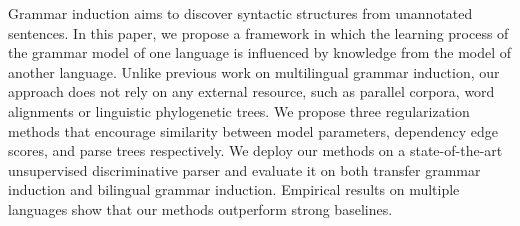 Grammar induction aims to discover syntactic structures from unannotated sentences.
In this paper, we propose a framework in which the learning process of the grammar model of one language is influenced by knowledge from the model of another language. Unlike previous work on multilingual grammar induction, our approach does not rely on any external resource, such as parallel corpora, word alignments or linguistic phylogenetic trees. We propose three regularization methods that encourage similarity between model parameters, dependency edge scores, and parse trees respectively. We deploy our methods on a state-of-the-art unsupervised discriminative parser and evaluate it on both transfer grammar induction and bilingual grammar induction. Empirical results on multiple languages show that our methods outperform strong baselines.